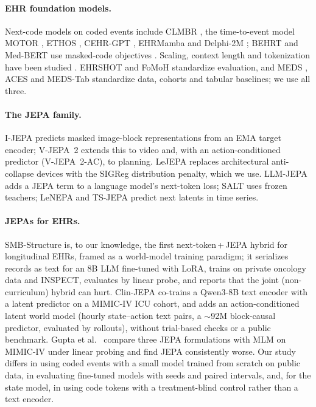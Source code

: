 \documentclass[10pt,letterpaper]{article}
\begin{document}
\paragraph{EHR foundation models.}
Next-code models on coded events include CLMBR \citep{clmbr}, the
time-to-event model MOTOR \citep{motor}, ETHOS \citep{ethos}, CEHR-GPT
\citep{cehrgpt}, EHRMamba \citep{ehrmamba} and Delphi-2M \citep{delphi2m};
BEHRT and Med-BERT use masked-code objectives \citep{behrt,medbert}. Scaling,
context length and tokenization have been studied
\citep{ehrscaling,contextclues,tokenization}. EHRSHOT \citep{ehrshot} and FoMoH
\citep{fomoh} standardize evaluation, and MEDS \citep{meds}, ACES \citep{aces}
and MEDS-Tab \citep{medstab} standardize data, cohorts and tabular baselines;
we use all three.

\paragraph{The JEPA family.}
I-JEPA \citep{ijepa} predicts masked image-block representations from an EMA
target encoder; V-JEPA~2 \citep{vjepa2} extends this to video and, with an
action-conditioned predictor (V-JEPA~2-AC), to planning. LeJEPA
\citep{lejepa} replaces architectural anti-collapse devices with the SIGReg
distribution penalty, which we use. LLM-JEPA \citep{llmjepa} adds a JEPA term
to a language model's next-token loss; SALT \citep{salt} uses frozen teachers;
LeNEPA \citep{lenepa} and TS-JEPA \citep{tsjepa} predict next latents in time
series.

\paragraph{JEPAs for EHRs.}
SMB-Structure \citep{smbstructure} is, to our knowledge, the first
next-token\,+\,JEPA hybrid for longitudinal EHRs, framed as a world-model
training paradigm; it serializes records as text for an 8B LLM fine-tuned with
LoRA, trains on private oncology data and INSPECT, evaluates by linear probe, and
reports that the joint (non-curriculum) hybrid can hurt. Clin-JEPA
\citep{clinjepa} co-trains a Qwen3-8B text encoder with a latent predictor on a
MIMIC-IV ICU cohort, and adds an action-conditioned latent world model
(hourly state--action text pairs, a $\sim$92M block-causal predictor,
evaluated by rollouts), without trial-based checks or a public benchmark. Gupta et al.\ \citep{imperialjepa} compare three JEPA
formulations with MLM on MIMIC-IV under linear probing and find JEPA
consistently worse. Our study differs in using coded events with a small model
trained from scratch on public data, in evaluating fine-tuned models with
seeds and paired intervals, and, for the state model, in using code tokens
with a treatment-blind control rather than a text encoder.
\end{document}
